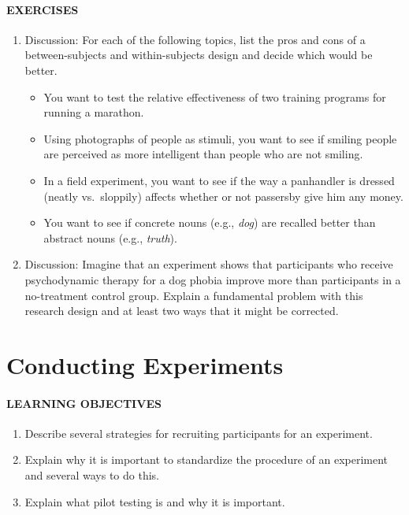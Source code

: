 \documentclass[
]{krantz}
\providecommand{\tightlist}{%
  \setlength{\itemsep}{0pt}\setlength{\parskip}{0pt}}
\begin{document}
\paragraph*{EXERCISES}\label{exercises-6}

\begin{enumerate}
\def\labelenumi{\arabic{enumi}.}
\tightlist
\item
  Discussion: For each of the following topics, list the pros and cons of a between-subjects and within-subjects design and decide which would be better.

  \begin{itemize}
  \tightlist
  \item
    You want to test the relative effectiveness of two training programs for running a marathon.
  \item
    Using photographs of people as stimuli, you want to see if smiling people are perceived as more intelligent than people who are not smiling.
  \item
    In a field experiment, you want to see if the way a panhandler is dressed (neatly vs.~sloppily) affects whether or not passersby give him any money.
  \item
    You want to see if concrete nouns (e.g., \emph{dog}) are recalled better than abstract nouns (e.g., \emph{truth}).
  \end{itemize}
\item
  Discussion: Imagine that an experiment shows that participants who receive psychodynamic therapy for a dog phobia improve more than participants in a no-treatment control group. Explain a fundamental problem with this research design and at least two ways that it might be corrected.
\end{enumerate}

\section{Conducting Experiments}\label{conducting-experiments}

\paragraph*{LEARNING OBJECTIVES}\label{learning-objectives-8}

\begin{enumerate}
\def\labelenumi{\arabic{enumi}.}
\tightlist
\item
  Describe several strategies for recruiting participants for an experiment.
\item
  Explain why it is important to standardize the procedure of an experiment and several ways to do this.
\item
  Explain what pilot testing is and why it is important.
\end{enumerate}
\end{document}
